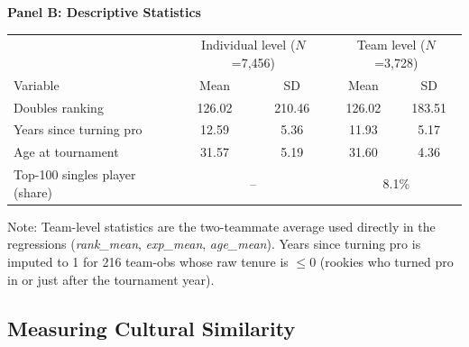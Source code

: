 \documentclass[10pt]{article}
\begin{document}
\begin{table}[h!]
\begin{threeparttable}
\vspace{10pt}
\textbf{Panel B: Descriptive Statistics}\\[2pt]
\begin{tabular}{lcccc}
\toprule
 & \multicolumn{2}{c}{Individual level ($N$=7,456)} & \multicolumn{2}{c}{Team level ($N$=3,728)} \\
Variable & Mean & SD & Mean & SD \\
\midrule
Doubles ranking            & 126.02 & 210.46 & 126.02 & 183.51 \\
Years since turning pro    & 12.59  & 5.36   & 11.93  & 5.17   \\
Age at tournament          & 31.57  & 5.19   & 31.60  & 4.36   \\
Top-100 singles player (share) & \multicolumn{2}{c}{--} & \multicolumn{2}{c}{8.1\%} \\
\bottomrule
\end{tabular}
\begin{tablenotes}
\small
\item Note: %
Team-level statistics are the two-teammate average used directly in the regressions (\textit{rank\_mean}, \textit{exp\_mean}, \textit{age\_mean}). Years since turning pro is imputed to 1 for 216 team-obs whose raw tenure is $\le 0$ (rookies who turned pro in or just after the tournament year). %
\end{tablenotes}
\end{threeparttable}
\end{table}



\subsection{Measuring Cultural Similarity}
\end{document}
